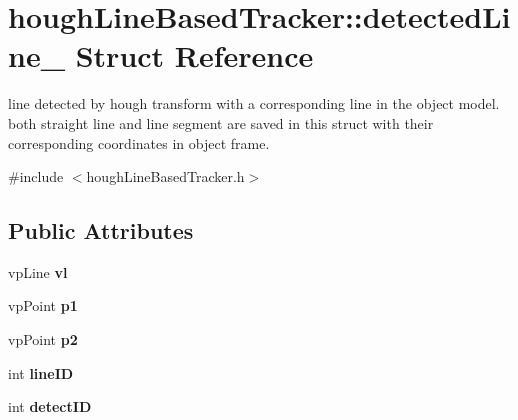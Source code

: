 \hypertarget{structhoughLineBasedTracker_1_1detectedLine__}{\section{hough\-Line\-Based\-Tracker\-:\-:detected\-Line\-\_\- \-Struct \-Reference}
\label{structhoughLineBasedTracker_1_1detectedLine__}
}


line detected by hough transform with a corresponding line in the object model. both straight line and line segment are saved in this struct with their corresponding coordinates in object frame.  




{\ttfamily \#include $<$hough\-Line\-Based\-Tracker.\-h$>$}

\subsection*{\-Public \-Attributes}
\begin{DoxyCompactItemize}
\item 
\hypertarget{structhoughLineBasedTracker_1_1detectedLine___a1f9a0eb137cd0056524fe71fec244b4e}{vp\-Line {\bfseries vl}}\label{structhoughLineBasedTracker_1_1detectedLine___a1f9a0eb137cd0056524fe71fec244b4e}

\item 
\hypertarget{structhoughLineBasedTracker_1_1detectedLine___a1b217d64574501a9f60b865bde5105e6}{vp\-Point {\bfseries p1}}\label{structhoughLineBasedTracker_1_1detectedLine___a1b217d64574501a9f60b865bde5105e6}

\item 
\hypertarget{structhoughLineBasedTracker_1_1detectedLine___a2bc246a998da71ba7968f6ff9aa2329a}{vp\-Point {\bfseries p2}}\label{structhoughLineBasedTracker_1_1detectedLine___a2bc246a998da71ba7968f6ff9aa2329a}

\item 
\hypertarget{structhoughLineBasedTracker_1_1detectedLine___ae46ffb9972f46566206cd9930060f79a}{int {\bfseries line\-I\-D}}\label{structhoughLineBasedTracker_1_1detectedLine___ae46ffb9972f46566206cd9930060f79a}

\item 
\hypertarget{structhoughLineBasedTracker_1_1detectedLine___aac7f2104fc6ff4dbfe6acb4c3a598301}{int {\bfseries detect\-I\-D}}\label{structhoughLineBasedTracker_1_1detectedLine___aac7f2104fc6ff4dbfe6acb4c3a598301}

\end{DoxyCompactItemize}



